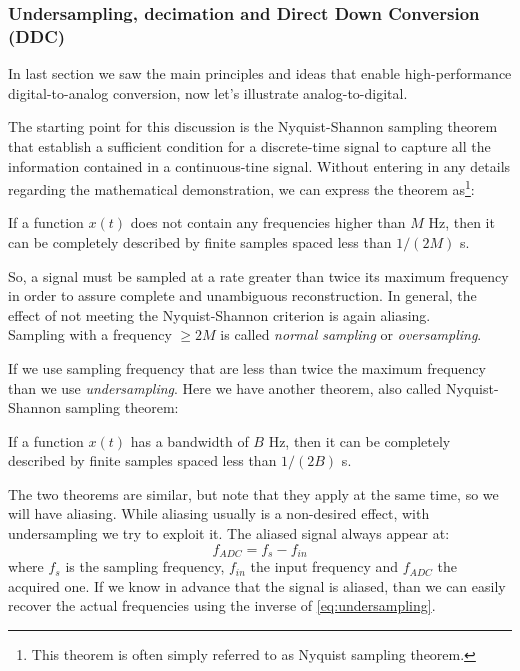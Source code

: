 \subsubsection{Undersampling, decimation and Direct Down Conversion (DDC)}

In last section we saw the main principles and ideas that enable high-performance digital-to-analog conversion, now let's illustrate analog-to-digital.

The starting point for this discussion is the Nyquist-Shannon sampling theorem that establish a sufficient condition for a discrete-time signal to capture all the information contained in a continuous-tine signal.
Without entering in any details regarding the mathematical demonstration, we can express the theorem as\footnote{This theorem is often simply referred to as Nyquist sampling theorem.}:
\begin{theorem}
    If a function $x(t)$ does not contain any frequencies higher than $M$ Hz, then it can be completely described by finite samples spaced less than $1/(2M)$ s.
\end{theorem}
So, a signal must be sampled at a rate greater than twice its maximum frequency in order to assure complete and unambiguous reconstruction.
In general, the effect of not meeting the Nyquist-Shannon criterion is again aliasing.\\
Sampling with a frequency $\ge 2M$ is called \textit{normal sampling} or \textit{oversampling}.

If we use sampling frequency that are less than twice the maximum frequency than we use \textit{undersampling}.
Here we have another theorem, also called Nyquist-Shannon sampling theorem:
\begin{theorem}
    If a function $x(t)$ has a bandwidth of $B$ Hz, then it can be completely described by finite samples spaced less than $1/(2B)$ s.
\end{theorem}
The two theorems are similar, but note that they apply at the same time, so we will have aliasing.
While aliasing usually is a non-desired effect, with undersampling we try to exploit it.
The aliased signal always appear at:
\begin{equation}\label{eq:undersampling}
    f_{ADC} = f_s - f_{in}
\end{equation}
where $f_s$ is the sampling frequency, $f_{in}$ the input frequency and $f_{ADC}$ the acquired one.
If we know in advance that the signal is aliased, than we can easily recover the actual frequencies using the inverse of \cref{eq:undersampling}.

